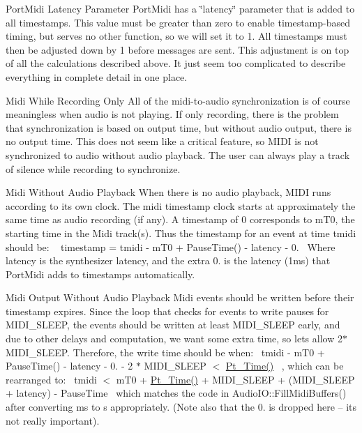 \begin{DoxyParagraph}{Port\+Midi Latency Parameter}
Port\+Midi has a \char`\"{}latency\char`\"{} parameter that is added to all timestamps. This value must be greater than zero to enable timestamp-\/based timing, but serves no other function, so we will set it to 1. All timestamps must then be adjusted down by 1 before messages are sent. This adjustment is on top of all the calculations described above. It just seem too complicated to describe everything in complete detail in one place.
\end{DoxyParagraph}
\begin{DoxyParagraph}{Midi While Recording Only}
All of the midi-\/to-\/audio synchronization is of course meaningless when audio is not playing. If only recording, there is the problem that synchronization is based on output time, but without audio output, there is no output time. This does not seem like a critical feature, so M\+I\+DI is not synchronized to audio without audio playback. The user can always play a track of silence while recording to synchronize.
\end{DoxyParagraph}
\begin{DoxyParagraph}{Midi Without Audio Playback}
When there is no audio playback, M\+I\+DI runs according to its own clock. The midi timestamp clock starts at approximately the same time as audio recording (if any). A timestamp of 0 corresponds to m\+T0, the starting time in the Midi track(s). Thus the timestamp for an event at time tmidi should be\+: ~\newline
 timestamp = tmidi -\/ m\+T0 + Pause\+Time() -\/ latency -\/ 0.~\newline
 Where latency is the synthesizer latency, and the extra 0. is the latency (1ms) that Port\+Midi adds to timestamps automatically.
\end{DoxyParagraph}
\begin{DoxyParagraph}{Midi Output Without Audio Playback}
Midi events should be written before their timestamp expires. Since the loop that checks for events to write pauses for M\+I\+D\+I\+\_\+\+S\+L\+E\+EP, the events should be written at least M\+I\+D\+I\+\_\+\+S\+L\+E\+EP early, and due to other delays and computation, we want some extra time, so let\textquotesingle{}s allow 2$\ast$\+M\+I\+D\+I\+\_\+\+S\+L\+E\+EP. Therefore, the write time should be when\+:~\newline
 tmidi -\/ m\+T0 + Pause\+Time() -\/ latency -\/ 0. -\/ 2 $\ast$ M\+I\+D\+I\+\_\+\+S\+L\+E\+EP $<$ \hyperlink{porttime_8h_a9a335bb8c04c85bf85d807dd448d72d0}{Pt\+\_\+\+Time()}~\newline
, which can be rearranged to\+:~\newline
 tmidi $<$ m\+T0 + \hyperlink{porttime_8h_a9a335bb8c04c85bf85d807dd448d72d0}{Pt\+\_\+\+Time()} + M\+I\+D\+I\+\_\+\+S\+L\+E\+EP + (M\+I\+D\+I\+\_\+\+S\+L\+E\+EP + latency) -\/ Pause\+Time~\newline
 which matches the code in Audio\+I\+O\+::\+Fill\+Midi\+Buffers() after converting ms to s appropriately. (Note also that the 0. is dropped here -- it\textquotesingle{}s not really important).
\end{DoxyParagraph}
